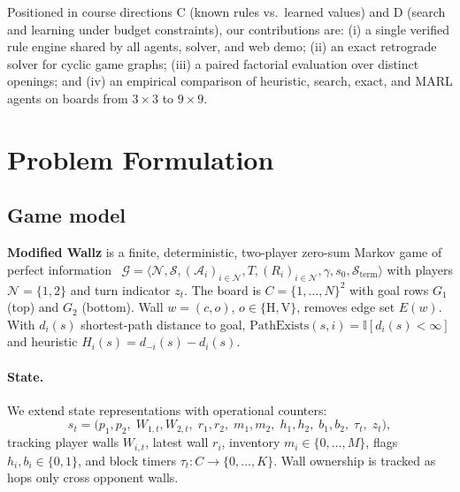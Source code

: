 \documentclass[10pt]{article}
\newcommand{\Wallz}{\textbf{Modified Wallz}}
\begin{document}
Positioned in course directions C (known rules vs.\ learned values) and D (search and learning under budget constraints), our contributions are: (i) a single verified rule engine shared by all agents, solver, and web demo; (ii) an exact retrograde solver for cyclic game graphs; (iii) a paired factorial evaluation over distinct openings; and (iv) an empirical comparison of heuristic, search, exact, and MARL agents on boards from $3\times3$ to $9\times9$.

\section{Problem Formulation}\label{sec:formulation}\subsection{Game model}
\Wallz{} is a finite, deterministic, two-player zero-sum Markov game of perfect information~\cite{littman1994,sutton2018} $\mathcal{G}=\langle \mathcal{N},\mathcal{S},(\mathcal{A}_i)_{i\in\mathcal{N}},T,(R_i)_{i\in\mathcal{N}},\gamma,s_0,\mathcal{S}_{\text{term}}\rangle$ with players $\mathcal{N}=\{1,2\}$ and turn indicator $z_t$. The board is $C=\{1,\dots,N\}^2$ with goal rows $G_1$ (top) and $G_2$ (bottom). Wall $w=(c,o)$, $o\in\{\mathrm{H},\mathrm{V}\}$, removes edge set $E(w)$. With $d_i(s)$ shortest-path distance to goal, $\mathrm{PathExists}(s,i)=\mathbb{I}[d_i(s)<\infty]$ and heuristic $H_i(s)=d_{-i}(s)-d_i(s)$.

\paragraph{State.} We extend state representations with operational counters:
\begin{equation}
s_t=\big(p_1,p_2,\;W_{1,t},W_{2,t},\;r_1,r_2,\;m_1,m_2,\;h_1,h_2,\;b_1,b_2,\;\tau_t,\;z_t\big),
\end{equation}
tracking player walls $W_{i,t}$, latest wall $r_i$, inventory $m_i\in\{0,\dots,M\}$, flags $h_i,b_i\in\{0,1\}$, and block timers $\tau_t:C\to\{0,\dots,K\}$. Wall ownership is tracked as hops only cross opponent walls.
\end{document}
